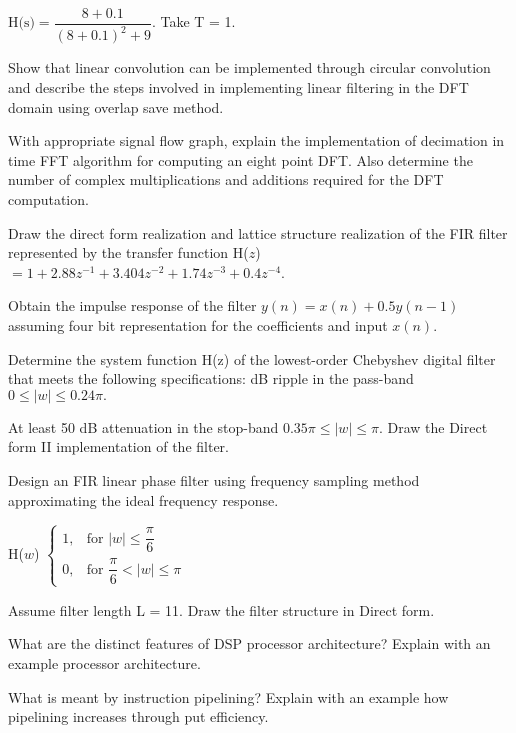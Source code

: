 \hspace{2cm}$\text{H(s)} = \dfrac{8 + 0.1}{(8 + 0.1)^2 + 9 }.$ Take T = 1.

\markB

\newpage \again

\partCo
\item 
\iitem Show that linear convolution can be implemented through circular convolution and describe the 
  steps involved in implementing linear filtering in the DFT domain using overlap
  save method.
\Or
\item With appropriate signal flow graph, explain the implementation of decimation in time FFT 
  algorithm for computing an eight point DFT. Also determine the number of complex multiplications
  and additions 
  required for the DFT computation.
\ene

\item \iitem
  Draw the direct form realization and lattice structure realization of the FIR filter represented
  by the transfer function H($z$)$ = 1 + 2.88z^{-1} + 3.404 z^{-2} + 1.74 z^{-3} + 0.4 z^{-4}$.
\Or
\item Obtain the impulse response of the filter $y(n) = x(n) + 0.5y(n-1)$ assuming four bit
  representation for the coefficients and input $x(n).$
\ene

\item \iitem Determine the system function H(z) of the lowest-order Chebyshev digital filter that meets the following
  specifications:
 dB ripple in the pass-band $ 0 \leq |w| \leq 0.24\pi.$
\item At least 50 dB attenuation in the stop-band $0.35\pi \leq |w|\leq \pi.$ Draw the Direct form II
  implementation of the filter.
\ene
\Or
\item Design an FIR linear phase filter using frequency sampling method approximating the ideal frequency response.

\hspace{2cm}H($w$) $\begin{cases}
 1, & \text{for }  |w| \leq \dfrac{\pi}{6}\\
 0, &\text{for } \dfrac{\pi}{6} <  |w| \leq \pi
\end{cases}$

Assume filter length L = 11. Draw the filter structure in Direct form.
\ene


\item \iitem What are the distinct features of DSP processor architecture? Explain with an
  example processor architecture.
\Or
\item What is meant by instruction pipelining? Explain with an example how pipelining
  increases through put efficiency.
\ene

\markC
\ene
